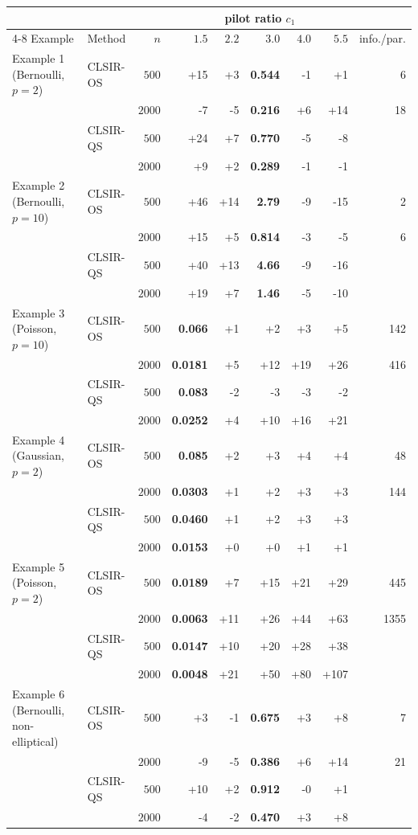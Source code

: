 \begin{tabular}{llrrrrrrr}
\toprule
& & & \multicolumn{5}{c}{pilot ratio $c_1$} & \\
\cmidrule(lr){4-8}
Example & Method & $n$ & $1.5$ & $2.2$ & $3.0$ & $4.0$ & $5.5$ & info./par.\\
\midrule
Example 1 (Bernoulli, $p=2$) & CLSIR-OS & $500$ & +15 & +3 & \textbf{0.544} & -1 & +1 & 6\\
 &  & $2000$ & -7 & -5 & \textbf{0.216} & +6 & +14 & 18\\
 & CLSIR-QS & $500$ & +24 & +7 & \textbf{0.770} & -5 & -8 & \\
 &  & $2000$ & +9 & +2 & \textbf{0.289} & -1 & -1 & \\
\addlinespace
Example 2 (Bernoulli, $p=10$) & CLSIR-OS & $500$ & +46 & +14 & \textbf{2.79} & -9 & -15 & 2\\
 &  & $2000$ & +15 & +5 & \textbf{0.814} & -3 & -5 & 6\\
 & CLSIR-QS & $500$ & +40 & +13 & \textbf{4.66} & -9 & -16 & \\
 &  & $2000$ & +19 & +7 & \textbf{1.46} & -5 & -10 & \\
\addlinespace
Example 3 (Poisson, $p=10$) & CLSIR-OS & $500$ & \textbf{0.066} & +1 & +2 & +3 & +5 & 142\\
 &  & $2000$ & \textbf{0.0181} & +5 & +12 & +19 & +26 & 416\\
 & CLSIR-QS & $500$ & \textbf{0.083} & -2 & -3 & -3 & -2 & \\
 &  & $2000$ & \textbf{0.0252} & +4 & +10 & +16 & +21 & \\
\addlinespace
Example 4 (Gaussian, $p=2$) & CLSIR-OS & $500$ & \textbf{0.085} & +2 & +3 & +4 & +4 & 48\\
 &  & $2000$ & \textbf{0.0303} & +1 & +2 & +3 & +3 & 144\\
 & CLSIR-QS & $500$ & \textbf{0.0460} & +1 & +2 & +3 & +3 & \\
 &  & $2000$ & \textbf{0.0153} & +0 & +0 & +1 & +1 & \\
\addlinespace
Example 5 (Poisson, $p=2$) & CLSIR-OS & $500$ & \textbf{0.0189} & +7 & +15 & +21 & +29 & 445\\
 &  & $2000$ & \textbf{0.0063} & +11 & +26 & +44 & +63 & 1355\\
 & CLSIR-QS & $500$ & \textbf{0.0147} & +10 & +20 & +28 & +38 & \\
 &  & $2000$ & \textbf{0.0048} & +21 & +50 & +80 & +107 & \\
\addlinespace
Example 6 (Bernoulli, non-elliptical) & CLSIR-OS & $500$ & +3 & -1 & \textbf{0.675} & +3 & +8 & 7\\
 &  & $2000$ & -9 & -5 & \textbf{0.386} & +6 & +14 & 21\\
 & CLSIR-QS & $500$ & +10 & +2 & \textbf{0.912} & -0 & +1 & \\
 &  & $2000$ & -4 & -2 & \textbf{0.470} & +3 & +8 & \\
\bottomrule
\end{tabular}
